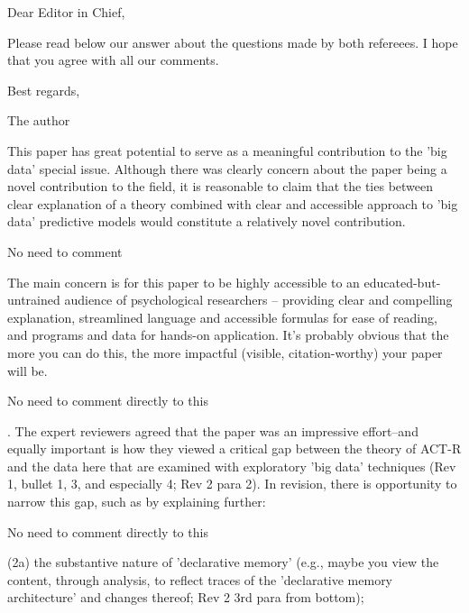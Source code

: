 \documentclass[answers,12pt]{exam}
\begin{document}
Dear Editor in Chief, \bigskip

Please read below our answer about the \numquestions{}
questions made by  both refereees. I hope that you agree
with all our comments. \bigskip

Best regards,\bigskip

The author


\begin{questions}

\question This paper has great potential to serve as a meaningful contribution to the 'big data' special issue. Although there was clearly concern about the paper being a novel contribution to the field, it is reasonable to claim that the ties between clear explanation of a theory combined with clear and accessible approach to 'big data' predictive models would constitute a relatively novel contribution.

\begin{solution}
No need to comment
\end{solution}

\question The main concern is for this paper to be highly accessible to an educated-but-untrained audience of psychological researchers -- providing clear and compelling explanation, streamlined language and accessible formulas for ease of reading, and programs and data for hands-on application. It's probably obvious that the more you can do this, the more impactful (visible, citation-worthy) your paper will be.

\begin{solution}
No need to comment directly to this
\end{solution}

. The expert reviewers agreed that the paper was an impressive effort--and equally important is how they viewed a critical gap between the theory of ACT-R and the data here that are examined with exploratory 'big data' techniques (Rev 1, bullet 1, 3, and especially 4; Rev 2 para 2). In revision, there is opportunity to narrow this gap, such as by explaining further:

\begin{solution}
No need to comment directly to this
\end{solution}

\question (2a) the substantive nature of 'declarative memory' (e.g., maybe you view the content, through analysis, to reflect traces of the 'declarative memory architecture' and changes thereof; Rev 2 3rd para from bottom);


\end{questions}
\end{document}
